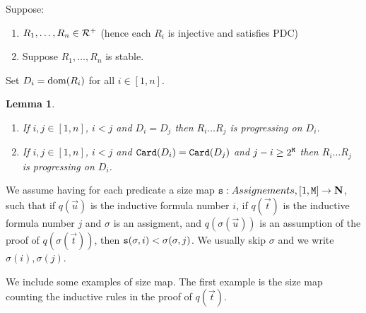\documentclass{lmcs}
\newtheorem{lemma}[theorem]{Lemma}
\begin{document}
Suppose:
\begin{enumerate}
\item
$R_1, \ldots, R_n \in {\mathcal R}^+$ (hence each $R_i$ is injective and satisfies PDC) 
\item
Suppose $R_1, \ldots, R_n$ is stable. 
\end{enumerate}
Set $D_i = {\rm dom}(R_i)$ for all $i \in [1,n]$.


\begin{lemma}
\begin{enumerate}
\item
If $i,j \in [1,n]$, $i<j$ and $D_i = D_j$ then $R_i \ldots R_j$ is progressing on $D_i$.
\item
If  $i,j \in [1,n]$, $i<j$ and ${\tt Card}(D_i) = {\tt Card}(D_j)$ and $j-i \ge 2^{{\tt M}}$ 
then $R_i \ldots R_j$ is progressing on $D_i$.
\end{enumerate}
\end{lemma}

We assume having for each predicate a size map ${\tt s} : Assignements, 
[1,{\tt M}] \rightarrow {\bf N}$,
such that if $q(\vec{u})$ is the inductive formula number $i$, if $q(\vec{t})$ is the inductive
formula number $j$ and $\sigma$ is an assigment, and $q(\sigma(\vec{u}))$ is an assumption
of the proof of $q(\sigma(\vec{t}))$, then ${\tt s}(\sigma,i) < \sigma(\sigma,j)$. We usually 
skip $\sigma$ and we write $\sigma(i), \sigma(j)$.

We include some examples of size map. The first example is the size map counting the
inductive rules in the proof of $q(\vec{t})$.
\end{document}
